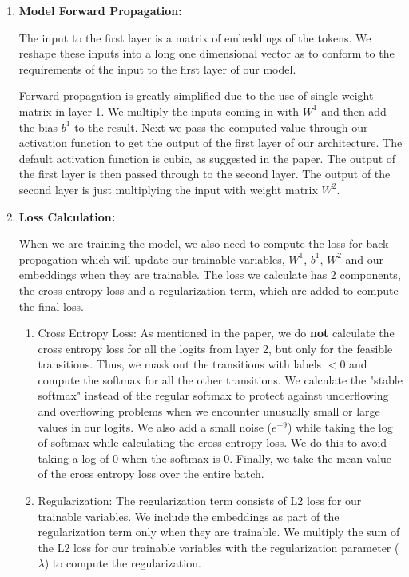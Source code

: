 \documentclass[11pt]{article}
\begin{document}
\begin{enumerate}
\item \textbf{Model Forward Propagation:}

The input to the first layer is a matrix of embeddings of the tokens. We reshape these inputs into a long one dimensional vector as to conform to the requirements of the input to the first layer of our model.

Forward propagation is greatly simplified due to the use of single weight matrix in layer 1. We multiply the inputs coming in with $W^1$ and then add the bias $b^1$ to the result. Next we pass the computed value through our activation function to get the output of the first layer of our architecture. The default activation function is cubic, as suggested in the paper. The output of the first layer is then passed through to the second layer. The output of the second layer is just multiplying the input with weight matrix $W^2$.

\item \textbf{Loss Calculation:}

When we are training the model, we also need to compute the loss for back propagation which will update our trainable variables, $ W^1 $, $ b^1 $, $ W^2 $ and our embeddings when they are trainable. The loss we calculate has 2 components, the cross entropy loss and a regularization term, which are added to compute the final loss.

\begin{enumerate}
	\item Cross Entropy Loss: As mentioned in the paper, we do \textbf{not} calculate the cross entropy loss for all the logits from layer 2, but only for the feasible transitions. Thus, we mask out the transitions with labels $ < 0 $ and compute the softmax for all the other transitions. We calculate the "stable softmax" instead of the regular softmax to protect against underflowing and overflowing problems when we encounter unusually small or large values in our logits. We also add a small noise ($e^{-9}$) while taking the log of softmax while calculating the cross entropy loss. We do this to avoid taking a log of 0 when the softmax is 0. Finally, we take the mean value of the cross entropy loss over the entire batch.
	
	\item Regularization: The regularization term consists of L2 loss for our trainable variables. We include the embeddings as part of the regularization term only when they are trainable. We multiply the sum of the L2 loss for our trainable variables with the regularization parameter ($\lambda$) to compute the regularization.
	

\end{enumerate}
\end{enumerate}
\end{document}
